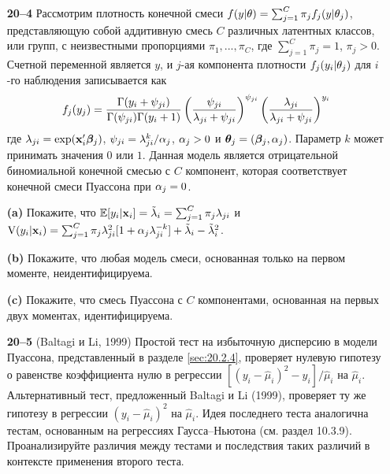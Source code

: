 \begin{itemize}
    \item[\textbf{20--4}]
Рассмотрим плотность конечной смеси $f(y|\theta) = \sum^{C}_{j = 1} \pi_j f_j (y|\theta_j)$, представляющую собой аддитивную смесь $C$ различных латентных классов, или групп, с неизвестными пропорциями $\pi_1, ..., \pi_C$, где $\sum^{C}_{j = 1} \pi_j = 1$, $\pi_j > 0$. Счетной переменной является $y$, и $j$-ая компонента плотности $f_j(y_i|\theta_j)$ для $i$-го наблюдения записывается как
        $$f_j(y_j) = \frac{\Gamma(y_i + \psi_{ji})}{\Gamma(\psi_{ji})\Gamma(y_i + 1)} \left( \frac{\psi_{ji}}{\lambda_{ji} + \psi_{ji}} \right)^{\psi_{ji}} \left( \frac{\lambda_{ji}}{\lambda_{ji} + \psi_{ji}} \right)^{y_{i}}$$
где $\lambda_{ji} = \exp(\mathbf{x}_i'\bm{\beta}_j)$, $\psi_{ji} = \lambda^k_{ji} / \alpha_j$, $\alpha_j > 0$ и $\bm{\theta}_j = (\bm{\beta}_j, \alpha_j)$. Параметр $k$ может принимать значения $0$ или $1$. Данная модель является отрицательной биномиальной конечной смесью с $C$ компонент, которая соответствует конечной смеси Пуассона при $\alpha_j = 0$.
        \item[\textbf{(a)}]
Покажите, что $\mathbb{E}[y_i|\mathbf{x}_i] = \tilde{\lambda}_i = \sum^{C}_{j = 1} \pi_j \lambda_{ji}$ и $\mathrm{V}(y_i|\mathbf{x}_i) = \sum^{C}_{j = 1} \pi_j \lambda^2_{ji} [1 + \alpha_j \lambda^{-k}_{ji}] + \tilde{\lambda}_i - \tilde{\lambda}_i^2$.
        \item[\textbf{(b)}]
Покажите, что любая модель смеси, основанная только на первом моменте, неидентифицируема.
        \item[\textbf{(c)}]
Покажите, что смесь Пуассона с $C$ компонентами, основанная на первых двух моментах, идентифицируема.

    \item[\textbf{20--5}]
(Baltagi и Li, 1999) Простой тест на избыточную дисперсию в модели Пуассона, представленный в разделе \ref{sec:20.2.4}, проверяет нулевую гипотезу о равенстве коэффициента нулю в регрессии $[(y_i - \hat{\mu}_i)^2 - y_i] / \hat{\mu}_i$ на $\hat{\mu}_i$. Альтернативный тест, предложенный Baltagi и Li (1999), проверяет ту же гипотезу в регрессии $(y_i - \hat{\mu}_i)^2$ на $\hat{\mu}_i$. Идея последнего теста аналогична тестам, основанным на регрессиях Гаусса--Ньютона (см. раздел 10.3.9). Проанализируйте различия между тестами и последствия таких различий в контексте применения второго теста.


\end{itemize}
